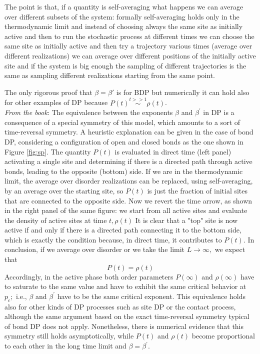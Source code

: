 \documentclass[\main/main.tex]{subfiles}
\begin{document}
The point is that, if a quantity is self-averaging what happens we can average over different subsets of the system: formally self-averaging holds only in the thermodynamic limit and instead of choosing always the same site as initially active and then to run the stochastic process at different times we can choose the same site as initially active and then try a trajectory various times (average over different realizations) we can average over different positions of the initially active site and if the system is big enough the sampling of different trajectories is the same as sampling different realizations starting from the same point. 

The only rigorous proof that $\beta=\beta'$ is for BDP but numerically it can hold also for other examples of DP because $P(t)\overset{t>>1}{\sim}\rho(t)$. \\

\textit{From the book}: 
The equivalence between the exponents $\beta$ and $\beta^{\prime}$ in DP is a consequence of a special symmetry of this model, which amounts to a sort of time-reversal symmetry. A heuristic explanation can be given in the case of bond DP, considering a configuration of open and closed bonds as the one shown in Figure \ref{fig:sp}. The quantity $P(t)$ is evaluated in direct time (left panel) activating a single site and determining if there is a directed path through active bonds, leading to the opposite (bottom) side. If we are in the thermodynamic limit, the average over disorder realizations can be replaced, using self-averaging, by an average over the starting site, so $P(t)$ is just the fraction of initial sites that are connected to the opposite side. Now we revert the time arrow, as shown in the right panel of the same figure: we start from all active sites and evaluate the density of active sites at time $t, \rho(t)$ It is clear that a "top" site is now active if and only if there is a directed path connecting it to the bottom side, which is exactly the condition because, in direct time, it contributes to $P(t) .$ In conclusion, if we average over disorder or we take the limit $L \rightarrow \infty,$ we expect that
$$
P(t)=\rho(t)
$$
Accordingly, in the active phase both order parameters $P(\infty)$ and $\rho(\infty)$ have to saturate to the same value and have to exhibit the same critical behavior at $p_{c} ;$ i.e., $\beta$ and $\beta^{\prime}$ have to be the same critical exponent. This equivalence holds also for other kinds of DP processes such as site DP or the contact process, although the same argument based on the exact time-reversal symmetry typical of bond DP does not apply. Nonetheless, there is numerical evidence that this symmetry still holds asymptotically, while $P(t)$ and $\rho(t)$ become proportional to each other in the long time limit and $\beta=\beta^{\prime}$.\\
\end{document}

